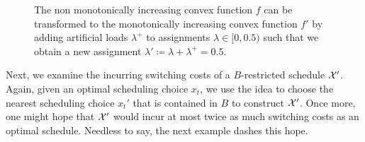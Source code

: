 \begin{figure}[H]
\captionsetup[subfigure]{labelformat=empty}
\begin{subfigure}[b]{0.5\textwidth}

\end{subfigure}
\hfill
\begin{subfigure}[b]{0.5\textwidth}

\end{subfigure}
\caption{The non monotonically increasing convex function $f$ can be transformed to the monotonically increasing convex function $f'$ by adding artificial loads $\lambda^+$ to assignments $\lambda\in[0,0.5)$ such that we obtain a new assignment $\lambda'\coloneqq\lambda+\lambda^+=0.5$.}
\label{fig:transform_to_mono_incr}
\end{figure}
Next, we examine the incurring switching costs of a $B$-restricted schedule $\mathcal{X}'$. Again, given an optimal scheduling choice $x_t$, we use the idea to choose the nearest scheduling choice $x_t'$ that is contained in $B$ to construct $\mathcal{X}'$. Once more, one might hope that $\mathcal{X}'$ would incur at most twice as much switching costs as an optimal schedule. Needless to say, the next example dashes this hope.
